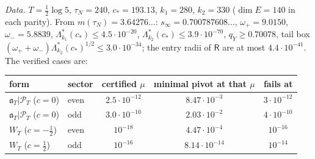 \documentclass[10pt]{amsart}
\theoremstyle{definition}
\theoremstyle{remark}
\newcommand{\PT}{\mathcal P_T}
\begin{document}
\emph{Data.} $T=\frac12\log5$, $\tau_N=240$, $c_*=193.13$, $k_1=280$, $k_2=330$ ($\dim E=140$ in each parity).
From $m(\tau_N)=3.64276\ldots$: $s_\infty=0.700787608\ldots$, $\omega_+=9.0150$, $\omega_-=5.8839$,
$\Lambda^*_{k_1}(c_*)\le4.5\cdot10^{-20}$, $\Lambda^*_{k_2}(c_*)\le3.9\cdot10^{-70}$, $q_Y\ge0.70078$, tail
box $(\omega_++\omega_-)\Lambda^*_{k_2}(c_*)^{1/2}\le3.0\cdot10^{-34}$; the entry radii of $\mathsf R$ are at
most $4.4\cdot10^{-41}$. The verified cases are:
\begin{center}\small
\begin{tabular}{@{}llccc@{}}
\toprule
form & sector & certified $\mu$ & minimal pivot at that $\mu$ & fails at\\
\midrule
$\mathfrak a_T|\PT$ ($c=0$) & even & $2.5\cdot10^{-12}$ & $8.47\cdot10^{-3}$ & $3\cdot10^{-12}$\\
$\mathfrak a_T|\PT$ ($c=0$) & odd & $3.0\cdot10^{-10}$ & $2.03\cdot10^{-2}$ & $4\cdot10^{-10}$\\
$W_T$ ($c=-\frac12$) & even & $10^{-18}$ & $4.47\cdot10^{-4}$ & $10^{-16}$\\
$W_T$ ($c=\frac12$) & odd & $10^{-16}$ & $8.14\cdot10^{-14}$ & $10^{-14}$\\
\bottomrule
\end{tabular}
\end{center}
\end{document}
